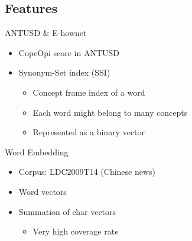 \documentclass[compress]{beamer}
\begin{document}
    \subsection{Features}
        \begin{frame}{\subsecname}
            \begin{block}{ANTUSD \& E-hownet}
                \begin{itemize}
                    \item CopeOpi score in ANTUSD
                    \item Synonym-Set index (SSI)
                        \begin{itemize}
                            \item Concept frame index of a word
                            \item Each word might belong to many concepts
                            \item Represented as a binary vector %
                        \end{itemize}
                    \end{itemize}
                \end{block}
            \pause
            \begin{block}{Word Embedding}
                \begin{itemize}
                    \item Corpus: LDC2009T14 (Chinese news)
                    \item Word vectors %
                    \item Summation of char vectors %
                        \begin{itemize}
                        \item Very high coverage rate
                        \end{itemize}
                \end{itemize}
            \end{block}
        \end{frame}
\end{document}
